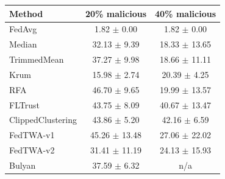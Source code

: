 \begin{tabular}{lcc}
\toprule
Method & 20\% malicious & 40\% malicious \\
\midrule
FedAvg & 1.82 $\pm$ 0.00 & 1.82 $\pm$ 0.00 \\
Median & 32.13 $\pm$ 9.39 & 18.33 $\pm$ 13.65 \\
TrimmedMean & 37.27 $\pm$ 9.98 & 18.66 $\pm$ 11.11 \\
Krum & 15.98 $\pm$ 2.74 & 20.39 $\pm$ 4.25 \\
RFA & 46.70 $\pm$ 9.65 & 19.99 $\pm$ 13.57 \\
FLTrust & 43.75 $\pm$ 8.09 & 40.67 $\pm$ 13.47 \\
ClippedClustering & 43.86 $\pm$ 5.20 & 42.16 $\pm$ 6.59 \\
FedTWA-v1 & 45.26 $\pm$ 13.48 & 27.06 $\pm$ 22.02 \\
FedTWA-v2 & 31.41 $\pm$ 11.19 & 24.13 $\pm$ 15.93 \\
Bulyan & 37.59 $\pm$ 6.32 & n/a \\
\bottomrule
\end{tabular}